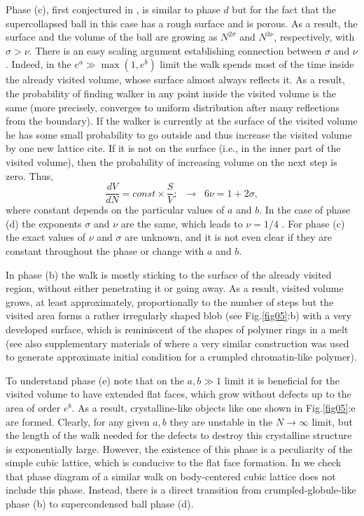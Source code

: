 \documentclass[aps,a4paper,twocolumn,showpacs]{revtex4}
\newcommand{\fig}[1]{Fig.\ref{#1}}
\newcommand{\be}{\begin{equation}}
\newcommand{\ee}{\end{equation}}
\begin{document}
Phase (c), first conjectured in \cite{kot_phase}, is similar to phase $d$ but for the fact that the supercollapsed ball in this case has a rough surface and is porous. As a result, the surface and the volume of the ball are growing as $N^{2\sigma}$ and $N^{3\nu}$, respectively, with $\sigma>\nu$. There is an easy scaling argument establishing connection between $\sigma$ and $\nu$. Indeed, in the $e^a\gg \max(1, e^b)$ limit the walk spends most of the time inside the already visited volume, whose surface almost always reflects it. As a result, the probability of finding walker in any point inside the visited volume is the same (more precisely, converges to uniform distribution after many reflections from the boundary). If the walker is currently at the surface of the visited volume he has some small probability to go outside and thus increase the visited volume by one new lattice cite. If it is not on the surface (i.e., in the inner part of the visited volume), then the probability of increasing volume on the next step is zero. Thus,
\be
\frac{dV}{dN} = const \times \frac{S}{V}; \;\; \rightarrow \;\; 6\nu  = 1+2\sigma,
\label{scaling}
\ee 
where constant depends on the particular values of $a$ and $b$. In the case of phase (d) the exponents $\sigma$ and $\nu$ are the same, which leads to $\nu =1/4$ \cite{sapozhnikov}. For phase (c) the exact values of $\nu$ and $\sigma$ are unknown, and it is not even clear if they are constant throughout the phase or change with $a$ and $b$. 

In phase (b) the walk is mostly sticking to the surface of the already visited region, without either penetrating it or going away. As a result, visited volume grows, at least approximately, proportionally to the number of steps but the visited area forms a rather irregularly shaped blob (see \fig{fig05}:b) with a very developed surface, which is reminiscent of the shapes of polymer rings in a melt \cite{grosb_review,rosa_everaers} (see also supplementary materials of \cite{tamm15} where a very similar construction was used to generate approximate initial condition for a crumpled chromatin-like polymer). 

To understand phase (e) note that on the $a,b \gg 1$ limit it is beneficial for the visited volume to have extended flat faces, which grow without defects up to the area of order $e^b$. As a result, crystalline-like objects like one shown in \fig{fig05}:e are formed. Clearly, for any given $a,b$ they are unstable in the $N \to \infty$ limit, but the length of the walk needed for the defects to destroy this crystalline structure is exponentially large. However, the existence of this phase is a peculiarity of the simple cubic lattice, which is conducive to the flat face formation. In \cite{supp} we check that phase diagram of a similar walk on body-centered cubic lattice does not include this phase. Instead, there is a direct transition from crumpled-globule-like phase (b) to supercondensed ball phase (d).
\end{document}
